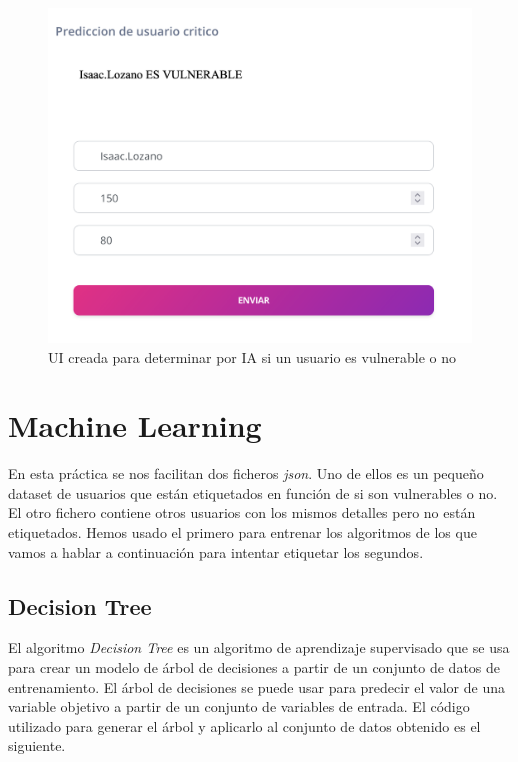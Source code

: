 \documentclass[12pt, a4paper,twoside,titlepage]{article}
\begin{document}
\begin{figure}[H]
    \centering
    \includegraphics[width=1\linewidth]{Figuras/metodoia.png}
    \caption{UI creada para determinar por IA si un usuario es vulnerable o no}
    \label{fig:IA}
\end{figure}



\section{Machine Learning}
En esta práctica se nos facilitan dos ficheros \emph{json}. Uno de ellos es un pequeño dataset de usuarios que están etiquetados en función de si son vulnerables o no.
El otro fichero contiene otros usuarios con los mismos detalles pero no están etiquetados.
Hemos usado el primero para entrenar los algoritmos de los que vamos a hablar a continuación para intentar etiquetar los segundos.
\subsection{Decision Tree}
El algoritmo \emph{Decision Tree} es un algoritmo de aprendizaje supervisado que se usa para crear un modelo de árbol de decisiones a partir de un conjunto de datos de entrenamiento. El árbol de decisiones se puede usar para predecir el valor de una variable objetivo a partir de un conjunto de variables de entrada.
El código utilizado para generar el árbol y aplicarlo al conjunto de datos obtenido es el siguiente.
\end{document}

